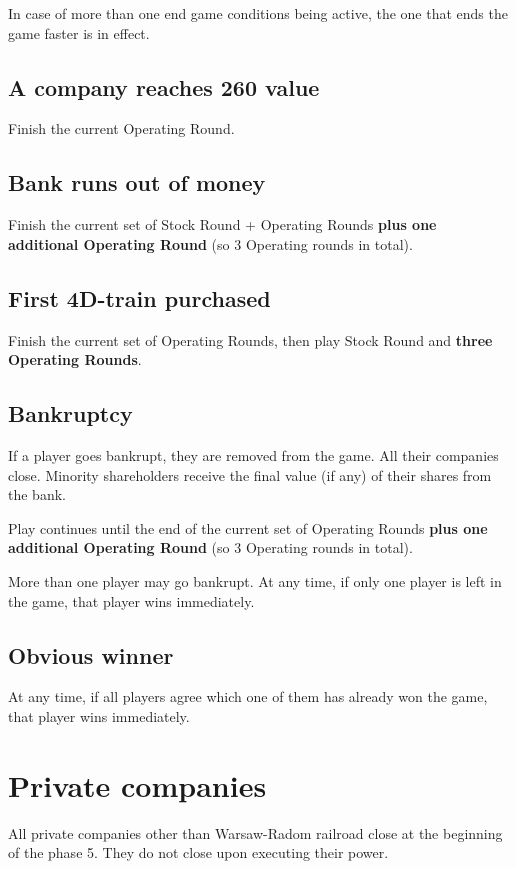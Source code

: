 \documentclass[10pt,a4paper,twocolumn]{article}
\begin{document}
In case of more than one end game conditions being active, the one that ends the game faster is in effect.

\subsection{A company reaches 260 value}
Finish the current Operating Round.

\subsection{Bank runs out of money}
Finish the current set of Stock Round + Operating Rounds \textbf{plus one additional Operating Round} (so 3 Operating rounds in total).

\subsection{First 4D-train purchased}
Finish the current set of Operating Rounds, then play Stock Round and \textbf{three Operating Rounds}.

\subsection{Bankruptcy}
If a player goes bankrupt, they are removed from the game. All their companies close. Minority shareholders receive the final value (if any) of their shares from the bank.

Play continues until the end of the current set of Operating Rounds \textbf{plus one additional Operating Round} (so 3 Operating rounds in total). 

More than one player may go bankrupt. At any time, if only one player is left in the game, that player wins immediately.

\subsection{Obvious winner}
At any time, if all players agree which one of them has already won the game, that player wins immediately.

\section{Private companies}

All private companies other than Warsaw-Radom railroad close at the beginning of the phase 5. They do not close upon executing their power.
\end{document}
